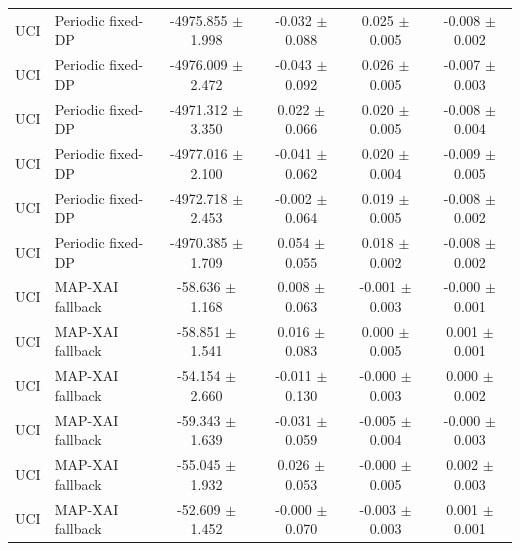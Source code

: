 \begin{table}[t]
\begin{tabular}{llcccc}
UCI & Periodic fixed-DP & -4975.855 $\pm$ 1.998 & -0.032 $\pm$ 0.088 & 0.025 $\pm$ 0.005 & -0.008 $\pm$ 0.002 \\
UCI & Periodic fixed-DP & -4976.009 $\pm$ 2.472 & -0.043 $\pm$ 0.092 & 0.026 $\pm$ 0.005 & -0.007 $\pm$ 0.003 \\
UCI & Periodic fixed-DP & -4971.312 $\pm$ 3.350 & 0.022 $\pm$ 0.066 & 0.020 $\pm$ 0.005 & -0.008 $\pm$ 0.004 \\
UCI & Periodic fixed-DP & -4977.016 $\pm$ 2.100 & -0.041 $\pm$ 0.062 & 0.020 $\pm$ 0.004 & -0.009 $\pm$ 0.005 \\
UCI & Periodic fixed-DP & -4972.718 $\pm$ 2.453 & -0.002 $\pm$ 0.064 & 0.019 $\pm$ 0.005 & -0.008 $\pm$ 0.002 \\
UCI & Periodic fixed-DP & -4970.385 $\pm$ 1.709 & 0.054 $\pm$ 0.055 & 0.018 $\pm$ 0.002 & -0.008 $\pm$ 0.002 \\
UCI & MAP-XAI fallback & -58.636 $\pm$ 1.168 & 0.008 $\pm$ 0.063 & -0.001 $\pm$ 0.003 & -0.000 $\pm$ 0.001 \\
UCI & MAP-XAI fallback & -58.851 $\pm$ 1.541 & 0.016 $\pm$ 0.083 & 0.000 $\pm$ 0.005 & 0.001 $\pm$ 0.001 \\
UCI & MAP-XAI fallback & -54.154 $\pm$ 2.660 & -0.011 $\pm$ 0.130 & -0.000 $\pm$ 0.003 & 0.000 $\pm$ 0.002 \\
UCI & MAP-XAI fallback & -59.343 $\pm$ 1.639 & -0.031 $\pm$ 0.059 & -0.005 $\pm$ 0.004 & -0.000 $\pm$ 0.003 \\
UCI & MAP-XAI fallback & -55.045 $\pm$ 1.932 & 0.026 $\pm$ 0.053 & -0.000 $\pm$ 0.005 & 0.002 $\pm$ 0.003 \\
UCI & MAP-XAI fallback & -52.609 $\pm$ 1.452 & -0.000 $\pm$ 0.070 & -0.003 $\pm$ 0.003 & 0.001 $\pm$ 0.001 \\
\bottomrule
\end{tabular}
\end{table}
